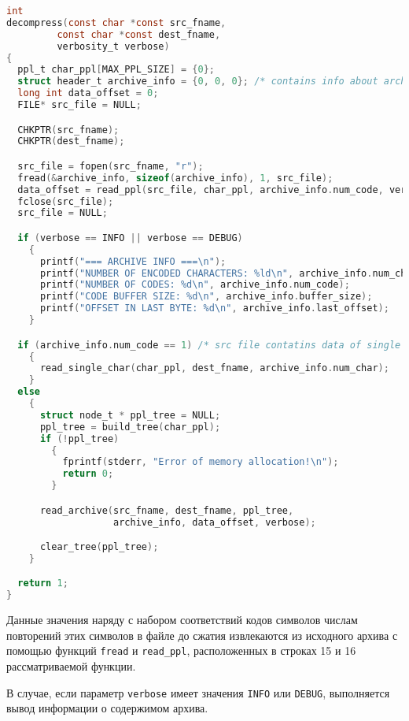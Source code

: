 \begin{lstlisting}[basicstyle=\scriptsize\ttfamily,
                   numberstyle=\scriptsize\ttfamily,
                   xleftmargin=7mm,
                   language=C,caption=Функция расжатия данных decompress,
                   label=lst:decompress]
int
decompress(const char *const src_fname,
         const char *const dest_fname,
         verbosity_t verbose)
{
  ppl_t char_ppl[MAX_PPL_SIZE] = {0};
  struct header_t archive_info = {0, 0, 0}; /* contains info about archive */
  long int data_offset = 0;
  FILE* src_file = NULL;

  CHKPTR(src_fname);
  CHKPTR(dest_fname);

  src_file = fopen(src_fname, "r");
  fread(&archive_info, sizeof(archive_info), 1, src_file);
  data_offset = read_ppl(src_file, char_ppl, archive_info.num_code, verbose);
  fclose(src_file);
  src_file = NULL;

  if (verbose == INFO || verbose == DEBUG)
    {
      printf("=== ARCHIVE INFO ===\n");
      printf("NUMBER OF ENCODED CHARACTERS: %ld\n", archive_info.num_char);
      printf("NUMBER OF CODES: %d\n", archive_info.num_code);
      printf("CODE BUFFER SIZE: %d\n", archive_info.buffer_size);
      printf("OFFSET IN LAST BYTE: %d\n", archive_info.last_offset);
    }

  if (archive_info.num_code == 1) /* src file contatins data of single character */
    {
      read_single_char(char_ppl, dest_fname, archive_info.num_char);
    }
  else
    {
      struct node_t * ppl_tree = NULL; 
      ppl_tree = build_tree(char_ppl);
      if (!ppl_tree)
        {
          fprintf(stderr, "Error of memory allocation!\n");
          return 0;
        }

      read_archive(src_fname, dest_fname, ppl_tree,
                   archive_info, data_offset, verbose);

      clear_tree(ppl_tree);
    }

  return 1;
}
\end{lstlisting}

Данные значения наряду с набором соответствий кодов символов числам повторений
этих символов в файле до сжатия извлекаются из исходного архива с
помощью функций \texttt{fread} и \texttt{read\_ppl}, расположенных
в строках 15 и 16 рассматриваемой функции.

В случае, если параметр \texttt{verbose} имеет значения
\texttt{INFO} или \texttt{DEBUG}, выполняется вывод информации 
о содержимом архива.

